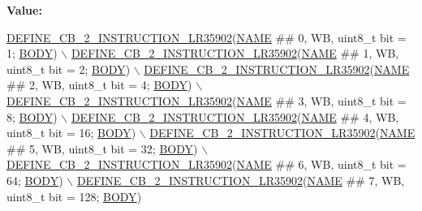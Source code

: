 {\bfseries Value\+:}
\begin{DoxyCode}
\mbox{\hyperlink{isa-lr35902_8c_a9f057efe45467caaaec1c9642e860178}{DEFINE\_CB\_2\_INSTRUCTION\_LR35902}}(\mbox{\hyperlink{inflate_8h_a164ea0159d5f0b5f12a646f25f99eceaa67bc2ced260a8e43805d2480a785d312}{NAME}} ## 0, WB, uint8\_t bit = 1; 
      \mbox{\hyperlink{gzlog_8c_aa6bdf6a6d9916c343e1e17774d84a156}{BODY}}) \(\backslash\)
    \mbox{\hyperlink{isa-lr35902_8c_a9f057efe45467caaaec1c9642e860178}{DEFINE\_CB\_2\_INSTRUCTION\_LR35902}}(\mbox{\hyperlink{inflate_8h_a164ea0159d5f0b5f12a646f25f99eceaa67bc2ced260a8e43805d2480a785d312}{NAME}} ## 1, WB, uint8\_t bit = 2; 
      \mbox{\hyperlink{gzlog_8c_aa6bdf6a6d9916c343e1e17774d84a156}{BODY}}) \(\backslash\)
    \mbox{\hyperlink{isa-lr35902_8c_a9f057efe45467caaaec1c9642e860178}{DEFINE\_CB\_2\_INSTRUCTION\_LR35902}}(\mbox{\hyperlink{inflate_8h_a164ea0159d5f0b5f12a646f25f99eceaa67bc2ced260a8e43805d2480a785d312}{NAME}} ## 2, WB, uint8\_t bit = 4; 
      \mbox{\hyperlink{gzlog_8c_aa6bdf6a6d9916c343e1e17774d84a156}{BODY}}) \(\backslash\)
    \mbox{\hyperlink{isa-lr35902_8c_a9f057efe45467caaaec1c9642e860178}{DEFINE\_CB\_2\_INSTRUCTION\_LR35902}}(\mbox{\hyperlink{inflate_8h_a164ea0159d5f0b5f12a646f25f99eceaa67bc2ced260a8e43805d2480a785d312}{NAME}} ## 3, WB, uint8\_t bit = 8; 
      \mbox{\hyperlink{gzlog_8c_aa6bdf6a6d9916c343e1e17774d84a156}{BODY}}) \(\backslash\)
    \mbox{\hyperlink{isa-lr35902_8c_a9f057efe45467caaaec1c9642e860178}{DEFINE\_CB\_2\_INSTRUCTION\_LR35902}}(\mbox{\hyperlink{inflate_8h_a164ea0159d5f0b5f12a646f25f99eceaa67bc2ced260a8e43805d2480a785d312}{NAME}} ## 4, WB, uint8\_t bit = 16; 
      \mbox{\hyperlink{gzlog_8c_aa6bdf6a6d9916c343e1e17774d84a156}{BODY}}) \(\backslash\)
    \mbox{\hyperlink{isa-lr35902_8c_a9f057efe45467caaaec1c9642e860178}{DEFINE\_CB\_2\_INSTRUCTION\_LR35902}}(\mbox{\hyperlink{inflate_8h_a164ea0159d5f0b5f12a646f25f99eceaa67bc2ced260a8e43805d2480a785d312}{NAME}} ## 5, WB, uint8\_t bit = 32; 
      \mbox{\hyperlink{gzlog_8c_aa6bdf6a6d9916c343e1e17774d84a156}{BODY}}) \(\backslash\)
    \mbox{\hyperlink{isa-lr35902_8c_a9f057efe45467caaaec1c9642e860178}{DEFINE\_CB\_2\_INSTRUCTION\_LR35902}}(\mbox{\hyperlink{inflate_8h_a164ea0159d5f0b5f12a646f25f99eceaa67bc2ced260a8e43805d2480a785d312}{NAME}} ## 6, WB, uint8\_t bit = 64; 
      \mbox{\hyperlink{gzlog_8c_aa6bdf6a6d9916c343e1e17774d84a156}{BODY}}) \(\backslash\)
    \mbox{\hyperlink{isa-lr35902_8c_a9f057efe45467caaaec1c9642e860178}{DEFINE\_CB\_2\_INSTRUCTION\_LR35902}}(\mbox{\hyperlink{inflate_8h_a164ea0159d5f0b5f12a646f25f99eceaa67bc2ced260a8e43805d2480a785d312}{NAME}} ## 7, WB, uint8\_t bit = 128; 
      \mbox{\hyperlink{gzlog_8c_aa6bdf6a6d9916c343e1e17774d84a156}{BODY}})
\end{DoxyCode}
